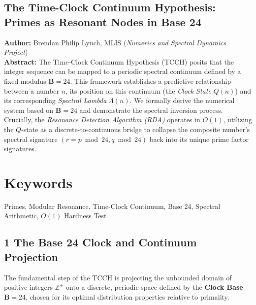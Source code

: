 \documentclass{article}
\newcommand{\Q}[1]{Q(#1)}
\newcommand{\Lam}[1]{\Lambda(#1)}
\begin{document}
\subsection*{The Time-Clock Continuum Hypothesis: Primes as Resonant Nodes in Base 24}
\noindent\textbf{Author:} Brendan Philip Lynch, MLIS (\textit{Numerics and Spectral Dynamics Project})\\
\noindent\textbf{Abstract:} The Time-Clock Continuum Hypothesis (TCCH) posits that the integer sequence can be mapped to a periodic spectral continuum defined by a fixed modulus $\mathbf{B}=24$. This framework establishes a predictive relationship between a number $n$, its position on this continuum (the \emph{Clock State} $\Q{n}$) and its corresponding \emph{Spectral Lambda} $\Lam{n}$. We formally derive the numerical system based on $\mathbf{B}=24$ and demonstrate the spectral inversion process. Crucially, the \emph{Resonance Detection Algorithm (RDA)} operates in $O(1)$, utilizing the $Q$-state as a discrete-to-continuous bridge to collapse the composite number’s spectral signature $(r=p\bmod 24,q\bmod 24)$ back into its unique prime factor signatures.
\section*{Keywords}
Primes, Modular Resonance, Time-Clock Continuum, Base 24, Spectral Arithmetic, $O(1)$ Hardness Test
\subsection*{1 The Base 24 Clock and Continuum Projection}
The fundamental step of the TCCH is projecting the unbounded domain of positive integers $\mathbb{Z}^+$ onto a discrete, periodic space defined by the \textbf{Clock Base} $\mathbf{B}=24$, chosen for its optimal distribution properties relative to primality.
\end{document}
